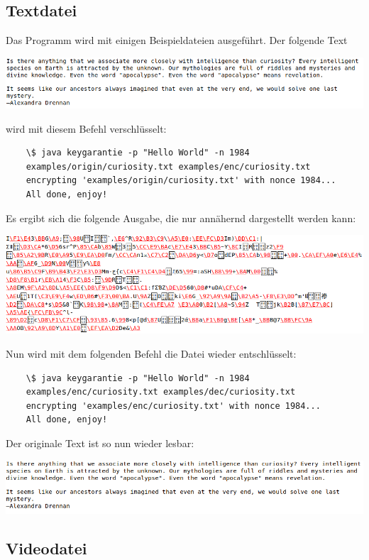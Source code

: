 \documentclass[10pt,a4paper]{article}
\begin{document}
\subsection{Textdatei}

Das Programm wird mit einigen Beispieldateien ausgeführt.
Der folgende Text
\begin{center}
    \includegraphics[width=1.0\textwidth]{curiosity_orig.png}
\end{center}
wird mit diesem Befehl verschlüsselt:
\begin{verbatim}
    \$ java keygarantie -p "Hello World" -n 1984
    examples/origin/curiosity.txt examples/enc/curiosity.txt
    encrypting 'examples/origin/curiosity.txt' with nonce 1984...
    All done, enjoy!
\end{verbatim}
Es ergibt sich die folgende Ausgabe, die nur annähernd dargestellt werden kann:
\begin{center}
    \includegraphics[width=1.0\textwidth]{curiosity_enc.png}
\end{center}
Nun wird mit dem folgenden Befehl die Datei wieder entschlüsselt:
\begin{verbatim}
    \$ java keygarantie -p "Hello World" -n 1984
    examples/enc/curiosity.txt examples/dec/curiosity.txt
    encrypting 'examples/enc/curiosity.txt' with nonce 1984...
    All done, enjoy!
\end{verbatim}
Der originale Text ist so nun wieder lesbar:
\begin{center}
    \includegraphics[width=1.0\textwidth]{curiosity_dec.png}
\end{center}

\subsection{Videodatei}
\end{document}
